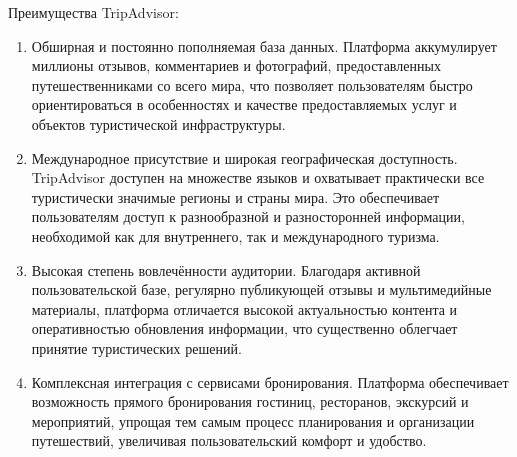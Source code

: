 Преимущества TripAdvisor:
\begin{enumerate}
    \item Обширная и постоянно пополняемая база данных. Платформа аккумулирует миллионы отзывов, комментариев и фотографий, предоставленных путешественниками со всего мира, что позволяет пользователям быстро ориентироваться в особенностях и качестве предоставляемых услуг и объектов туристической инфраструктуры.
    \item Международное присутствие и широкая географическая доступность. TripAdvisor доступен на множестве языков и охватывает практически все туристически значимые регионы и страны мира. Это обеспечивает пользователям доступ к разнообразной и разносторонней информации, необходимой как для внутреннего, так и международного туризма.
    \item Высокая степень вовлечённости аудитории. Благодаря активной пользовательской базе, регулярно публикующей отзывы и мультимедийные материалы, платформа отличается высокой актуальностью контента и оперативностью обновления информации, что существенно облегчает принятие туристических решений.
    \item Комплексная интеграция с сервисами бронирования. Платформа обеспечивает возможность прямого бронирования гостиниц, ресторанов, экскурсий и мероприятий, упрощая тем самым процесс планирования и организации путешествий, увеличивая пользовательский комфорт и удобство.
\end{enumerate}

